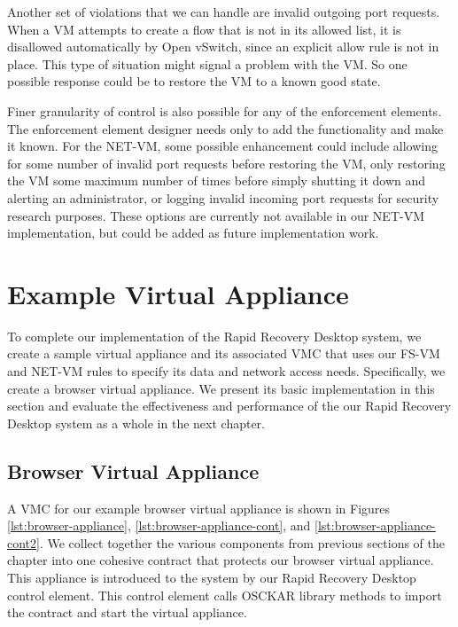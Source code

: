 Another set of violations that we can handle are invalid outgoing port requests. When a VM attempts to create a flow that is not in its allowed list, it is disallowed automatically by Open vSwitch, since an explicit allow rule is not in place. This type of situation might signal a problem with the VM. So one possible response could be to restore the VM to a known good state.

Finer granularity of control is also possible for any of the enforcement elements. The enforcement element designer needs only to add the functionality and make it known. For the NET-VM, some possible enhancement could include allowing for some number of invalid port requests before restoring the VM, only restoring the VM some maximum number of times before simply shutting it down and alerting an administrator, or logging invalid incoming port requests for security research purposes. These options are currently not available in our NET-VM implementation, but could be added as future implementation work.

\section{Example Virtual Appliance}
\label{sec:example-appliances-implementation}

To complete our implementation of the Rapid Recovery Desktop system, we create a sample virtual appliance and its associated VMC that uses our FS-VM and NET-VM rules to specify its data and network access needs. Specifically, we create a browser virtual appliance. We present its basic implementation in this section and evaluate the effectiveness and performance of the our Rapid Recovery Desktop system as a whole in the next chapter.

\subsection{Browser Virtual Appliance}

A VMC for our example browser virtual appliance is shown in Figures \ref{lst:browser-appliance}, \ref{lst:browser-appliance-cont}, and \ref{lst:browser-appliance-cont2}. We collect together the various components from previous sections of the chapter into one cohesive contract that protects our browser virtual appliance. This appliance is introduced to the system by our Rapid Recovery Desktop control element. This control element calls OSCKAR library methods to import the contract and start the virtual appliance. 

